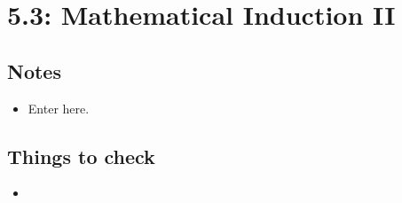 \documentclass{article}
\begin{document}
\newpage \section{5.3: Mathematical Induction II}
    \subsection{Notes}
        \begin{itemize}
            \item Enter here.
        \end{itemize}

    \subsection{Things to check}
        \begin{itemize}
            \item 
        \end{itemize}
\end{document}
